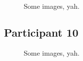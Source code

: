 \lipsum[1]

\clearpage

\begin{figure}[h]
	\caption{Some images, yah.}
\end{figure}

\lipsum[1]


\clearpage

\subsection{Participant 10}

\begin{figure}[h]
	\caption{Some images, yah.}
\end{figure}

